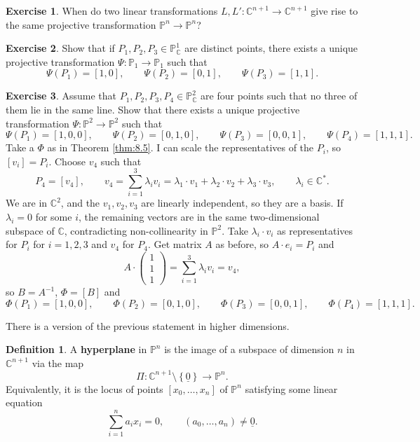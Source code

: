 \documentclass{article}
\newcommand{\C}{\mathbb{C}}
\renewcommand{\P}{\mathbb{P}}
\newcommand{\rb}[1]{\left( #1 \right)}
\renewcommand{\sb}[1]{\left[ #1 \right]}
\newcommand{\cb}[1]{\left\{ #1 \right\}}
\theoremstyle{definition}\newtheorem{definition}{Definition}[section]
\theoremstyle{definition}\newtheorem{notation}[definition]{Notation}
\theoremstyle{definition}\newtheorem{remark}[definition]{Remark}
\theoremstyle{definition}\newtheorem{example1}[definition]{Example}
\theoremstyle{definition}\newtheorem{fact}{Fact}
\theoremstyle{definition}\newtheorem{exercise}{Exercise}
\theoremstyle{definition}\newtheorem*{example2}{Example}
\begin{document}
\begin{exercise}
When do two linear transformations $ L, L' : \C^{n + 1} \to \C^{n + 1} $ give rise to the same projective transformation $ \P^n \to \P^n $?
\end{exercise}

\begin{exercise}
Show that if $ P_1, P_2, P_3 \in \P^1_\C $ are distinct points, there exists a unique projective transformation $ \Psi : \P_1 \to \P_1 $ such that
$$ \Psi\rb{P_1} = \sb{1, 0}, \qquad \Psi\rb{P_2} = \sb{0, 1}, \qquad \Psi\rb{P_3} = \sb{1, 1}. $$
\end{exercise}

\begin{exercise}
Assume that $ P_1, P_2, P_3, P_4 \in \P^2_\C $ are four points such that no three of them lie in the same line. Show that there exists a unique projective transformation $ \Psi : \P^2 \to \P^2 $ such that
$$ \Psi\rb{P_1} = \sb{1, 0, 0}, \qquad \Psi\rb{P_2} = \sb{0, 1, 0}, \qquad \Psi\rb{P_3} = \sb{0, 0, 1}, \qquad \Psi\rb{P_4} = \sb{1, 1, 1}. $$
Take a $ \Phi $ as in Theorem \ref{thm:8.5}. I can scale the representatives of the $ P_i $, so $ \sb{v_i} = P_i $. Choose $ v_4 $ such that
$$ P_4 = \sb{v_4}, \qquad v_4 = \sum_{i = 1}^3 \lambda_i v_i = \lambda_1 \cdot v_1 + \lambda_2 \cdot v_2 + \lambda_3 \cdot v_3, \qquad \lambda_i \in \C^*. $$
We are in $ \C^2 $, and the $ v_1, v_2, v_3 $ are linearly independent, so they are a basis. If $ \lambda_i = 0 $ for some $ i $, the remaining vectors are in the same two-dimensional subspace of $ \C $, contradicting non-collinearity in $ \P^2 $. Take $ \lambda_i \cdot v_i $ as representatives for $ P_i $ for $ i = 1, 2, 3 $ and $ v_4 $ for $ P_4 $. Get matrix $ A $ as before, so $ A \cdot e_i = P_i $ and
$$ A \cdot \begin{pmatrix}
1 \\
1 \\
1
\end{pmatrix} = \sum_{i = 1}^3 \lambda_iv_i = v_4, $$
so $ B = A^{-1} $, $ \Phi = \sb{B} $ and
$$ \Phi\rb{P_1} = \sb{1, 0, 0}, \qquad \Phi\rb{P_2} = \sb{0, 1, 0}, \qquad \Phi\rb{P_3} = \sb{0, 0, 1}, \qquad \Phi\rb{P_4} = \sb{1, 1, 1}. $$
\end{exercise}

There is a version of the previous statement in higher dimensions.

\begin{definition}
A \textbf{hyperplane} in $ \P^n $ is the image of a subspace of dimension $ n $ in $ \C^{n + 1} $ via the map
$$ \Pi : \C^{n + 1} \setminus \cb{\underline{0}} \to \P^n. $$
Equivalently, it is the locus of points $ \sb{x_0, \dots, x_n} $ of $ \P^n $ satisfying some linear equation
$$ \sum_{i = 1}^n a_ix_i = 0, \qquad \rb{a_0, \dots, a_n} \ne \underline{0}. $$
\end{definition}
\end{document}
